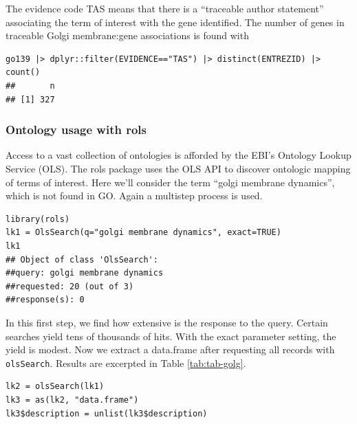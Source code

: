 The evidence code TAS means that there is a ``traceable author statement'' associating the term
of interest with the gene identified. The number of genes in traceable Golgi membrane:gene
associations is found with

\begin{shaded}
\begin{verbatim}
go139 |> dplyr::filter(EVIDENCE=="TAS") |> distinct(ENTREZID) |> count()
##       n
## [1] 327
\end{verbatim}
\end{shaded}


\subsubsection{Ontology usage with rols}\label{ontology-usage-with-rols}

Access to a vast collection of ontologies is afforded by the EBI's
Ontology Lookup Service (OLS). The rols package uses the OLS API
to discover ontologic mapping of terms of interest. Here we'll
consider the term ``golgi membrane dynamics'', which is not found in GO.
Again a multistep process is used.

\begin{shaded}
\begin{verbatim}
library(rols)
lk1 = OlsSearch(q="golgi membrane dynamics", exact=TRUE)
lk1
## Object of class 'OlsSearch':
##query: golgi membrane dynamics
##requested: 20 (out of 3)
##response(s): 0
\end{verbatim}
\end{shaded}


In this first step, we find how extensive is the response
to the query. Certain searches yield tens of thousands of hits.
With the exact parameter setting, the yield is modest.
Now we extract a data.frame after requesting all
records with \texttt{olsSearch}.  Results are
excerpted in Table \ref{tab:tab-golg}.

\begin{shaded}
\begin{verbatim}
lk2 = olsSearch(lk1)
lk3 = as(lk2, "data.frame")
lk3$description = unlist(lk3$description)
\end{verbatim}
\end{shaded}



